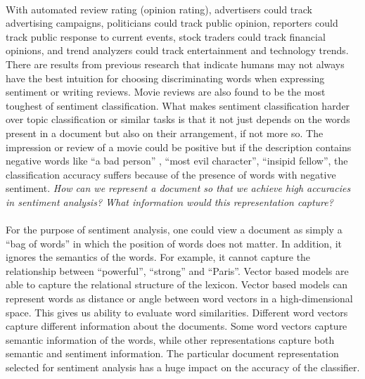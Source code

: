 \documentclass[a4paper,26pt]{article}
\begin{document}
\paragraph{}
With automated review rating (opinion rating), advertisers could track advertising campaigns, politicians could track public opinion, reporters could track public response to current events, stock traders could track financial opinions, and trend analyzers could track entertainment and technology trends.
There are results from previous research that indicate humans may not always have the best intuition for choosing discriminating words when expressing sentiment or writing reviews. Movie reviews are also found to be the most toughest of sentiment classification. What makes sentiment classification harder over topic classification or similar tasks is that it not just depends on the words present in a document but also on their arrangement, if not more so. The impression or review of a movie could be positive but if the description contains negative words like ``a bad person'' , ``most evil character'', ``insipid fellow'', the classification accuracy suffers because of the presence of words with negative sentiment. \textit{How can we represent a document so that we achieve high accuracies in sentiment analysis? What information would this representation capture?}

\paragraph{}
For the purpose of sentiment analysis, one could view a document as simply a ``bag of words'' in which the position of words does not matter. In addition, it ignores the semantics of the words. For example, it cannot capture the relationship between ``powerful'', ``strong'' and ``Paris''. Vector based models are able to capture the relational structure of the lexicon. Vector based models can represent words as distance or angle between word vectors in a high-dimensional space. This gives us ability to evaluate word similarities. Different word vectors capture different information about the documents. Some word vectors capture semantic information of the words, while other representations capture both semantic and sentiment information. The particular document representation selected for sentiment analysis has a huge impact on the accuracy of the classifier.
\end{document}

